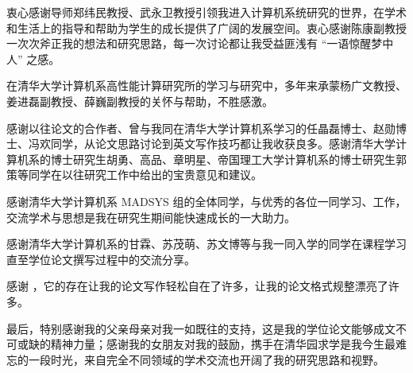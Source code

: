 \begin{acknowledgement}
衷心感谢导师郑纬民教授、武永卫教授引领我进入计算机系统研究的世界，在学术和生活上的指导和帮助为学生的成长提供了广阔的发展空间。衷心感谢陈康副教授一次次斧正我的想法和研究思路，每一次讨论都让我受益匪浅有 ``一语惊醒梦中人'' 之感。

在清华大学计算机系高性能计算研究所的学习与研究中，多年来承蒙杨广文教授、姜进磊副教授、薛巍副教授的关怀与帮助，不胜感激。

感谢以往论文的合作者、曾与我同在清华大学计算机系学习的任晶磊博士、赵勋博士、冯欢同学，从论文思路讨论到英文写作技巧都让我收获良多。感谢清华大学计算机系的博士研究生胡勇、高品、章明星、帝国理工大学计算机系的博士研究生郭策等同学在以往研究工作中给出的宝贵意见和建议。

感谢清华大学计算机系 MADSYS 组的全体同学，与优秀的各位一同学习、工作，交流学术与思想是我在研究生期间能快速成长的一大助力。

感谢清华大学计算机系的甘霖、苏茂萌、苏文博等与我一同入学的同学在课程学习直至学位论文撰写过程中的交流分享。

感谢 \thuthesis，它的存在让我的论文写作轻松自在了许多，让我的论文格式规整漂亮了许多。

最后，特别感谢我的父亲母亲对我一如既往的支持，这是我的学位论文能够成文不可或缺的精神力量；感谢我的女朋友对我的鼓励，携手在清华园求学是我今生最难忘的一段时光，来自完全不同领域的学术交流也开阔了我的研究思路和视野。

\end{acknowledgement}
